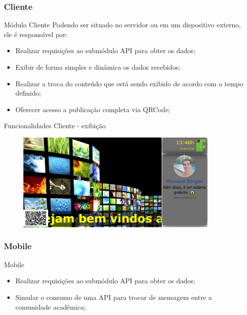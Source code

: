 \documentclass{aula-ifb}
\begin{document}
\subsubsection{Cliente}
\begin{frame}{Módulo Cliente}
Podendo ser situado no servidor ou em um dispositivo externo, ele é responsável por:
\begin{itemize}
   \item Realizar requisições ao submódulo API para obter os dados;
   \item Exibir de forma simples e dinâmica os dados recebidos;
   \item Realizar a troca do conteúdo que está sendo exibido de acordo com o tempo definido;
   \item Oferecer acesso a publicação completa via QRCode;
\end{itemize}
\end{frame}
\begin{frame}{Funcionalidades Cliente - exibição}
\begin{figure}[h]
\includegraphics[width=10cm]{figuras/funcionalidadeexibir.png}
\label{fig:facebookgraph}
\end{figure}
\end{frame}

\subsubsection{Mobile}
\begin{frame}{Mobile}
\begin{itemize}
   \item Realizar requisições ao submódulo API para obter os dados;
   \item Simular o consumo de uma API para trocar de mensagem entre a comunidade acadêmica;
\end{itemize}
\end{frame}
\end{document}

